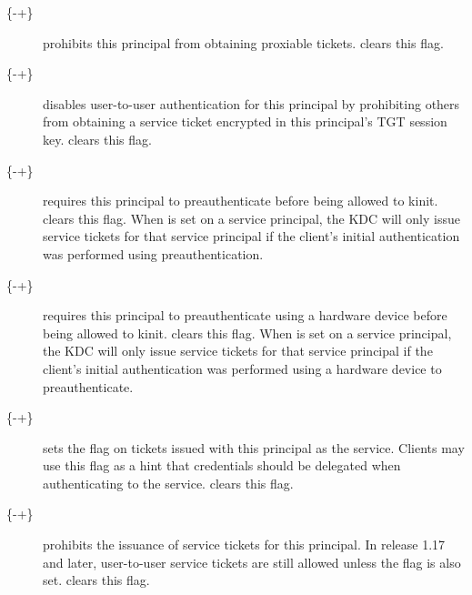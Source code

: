 \documentclass[letterpaper,10pt,english]{sphinxmanual}
\begin{document}
\begin{description}
\item[{\{-\textbar{}+\}}] \leavevmode
{} prohibits this principal from obtaining
proxiable tickets.   clears this flag.

\item[{\{-\textbar{}+\}}] \leavevmode
{} disables user-to-user authentication for this
principal by prohibiting others from obtaining a service ticket
encrypted in this principal’s TGT session key.
 clears this flag.

\item[{\{-\textbar{}+\}}] \leavevmode
{} requires this principal to preauthenticate
before being allowed to kinit.   clears this
flag.  When  is set on a service principal,
the KDC will only issue service tickets for that service principal
if the client’s initial authentication was performed using
preauthentication.

\item[{\{-\textbar{}+\}}] \leavevmode
{} requires this principal to preauthenticate
using a hardware device before being allowed to kinit.
 clears this flag.  When  is
set on a service principal, the KDC will only issue service tickets
for that service principal if the client’s initial authentication was
performed using a hardware device to preauthenticate.

\item[{\{-\textbar{}+\}}] \leavevmode
{} sets the  flag on tickets
issued with this principal as the service.  Clients may use this
flag as a hint that credentials should be delegated when
authenticating to the service.   clears this
flag.

\item[{\{-\textbar{}+\}}] \leavevmode
{} prohibits the issuance of service tickets for this
principal.  In release 1.17 and later, user-to-user service
tickets are still allowed unless the  flag is
also set.   clears this flag.


\end{description}
\end{document}

